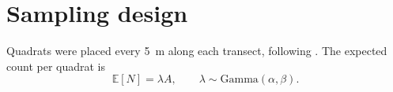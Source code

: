 \documentclass[11pt]{article}
\begin{document}
\section{Sampling design}
Quadrats were placed every \SI{5}{\metre} along each transect, following \textcite{bertness2007}.
The expected count per quadrat is
\begin{equation}
  \mathbb{E}[N] = \lambda A, \qquad \lambda \sim \mathrm{Gamma}(\alpha, \beta).
\end{equation}
\printbibliography
\end{document}
